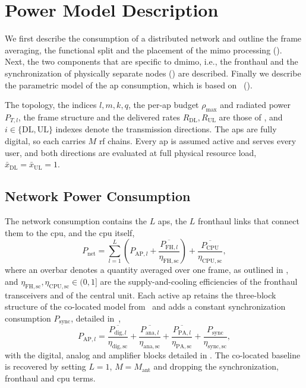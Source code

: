 \section{Power Model Description}
\label{sec:pwr_model}
We first describe the consumption of a distributed network and outline the frame averaging, the functional split and the placement of the \gls{mimo} processing (). Next, the two components that are specific to
\gls{dmimo}, i.e., the fronthaul and the synchronization of physically separate
nodes () are described. Finally we describe the parametric model of the \gls{ap}
consumption, which is based on~\cite{peschiera2026fr3} ().

The topology, the indices $l,m,k,q$, the per-\gls{ap} budget $\rho_{\max}$ and
radiated power $P_{T,l}$, the frame structure and
the delivered rates $R_{\mathrm{DL}},R_{\mathrm{UL}}$ are those of
, and $i\in\{\mathrm{DL},\mathrm{UL}\}$ indexes denote the transmission
directions. The \glspl{ap} are fully digital, so each carries $M$ \gls{rf} chains.
Every \gls{ap} is assumed active and serves every user, and both directions are
evaluated at full physical resource load,
$\bar x_{\mathrm{DL}}=\bar x_{\mathrm{UL}}=1$.

\subsection{Network Power Consumption}
\label{ssec:pnet}

The network consumption contains the $L$ \glspl{ap}, the $L$ fronthaul links
that connect them to the \gls{cpu}, and the \gls{cpu} itself,
\begin{equation}
\label{eq:pnet}
P_{\mathrm{net}} = \sum_{l=1}^{L}
\left(P_{\mathrm{AP},l} + \frac{\overline{P_{\mathrm{FH},l}}}{\eta_{\mathrm{FH,sc}}}\right)
+ \frac{\overline{P_{\mathrm{CPU}}}}{\eta_{\mathrm{CPU,sc}}},
\end{equation}
where an overbar denotes a quantity averaged over one frame, as outlined in , and
$\eta_{\mathrm{FH,sc}},\eta_{\mathrm{CPU,sc}}\in(0,1]$ are the
supply-and-cooling efficiencies of the fronthaul transceivers and of the central
unit.  Each active \gls{ap} retains the three-block structure of the co-located model from~\cite{peschiera2026fr3} and adds a constant synchronization consumption $P_{\mathrm{sync}}$, detailed in~,
\begin{equation}
\label{eq:pap}
P_{\mathrm{AP},l} =
\frac{\overline{P_{\mathrm{dig},l}}}{\eta_{\mathrm{dig,sc}}}
+ \frac{\overline{P_{\mathrm{ana},l}}}{\eta_{\mathrm{ana,sc}}}
+ \frac{\overline{P_{\mathrm{PA},l}}}{\eta_{\mathrm{PA,sc}}}
+ \frac{P_{\mathrm{sync}}}{\eta_{\mathrm{sync,sc}}} ,
\end{equation}
with the digital, analog and amplifier blocks detailed in . The
co-located baseline is recovered by setting $L=1$, $M=M_{\mathrm{ant}}$ and
dropping the synchronization, fronthaul and \gls{cpu} terms.


